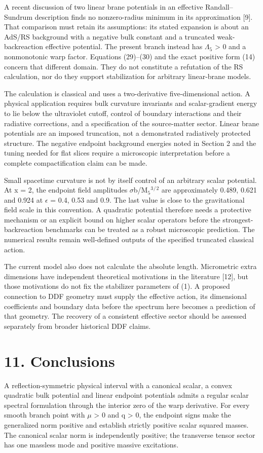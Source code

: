 \documentclass[11pt]{article}
\begin{document}
A recent discussion of two linear brane potentials in an effective Randall--Sundrum description finds no nonzero-radius minimum in its approximation [9]. That comparison must retain its assumptions: its stated expansion is about an AdS/RS background with a negative bulk constant and a truncated weak-backreaction effective potential. The present branch instead has \(\Lambda\)\({}_5\) > 0 and a nonmonotonic warp factor. Equations (29)--(30) and the exact positive form (14) concern that different domain. They do not constitute a refutation of the RS calculation, nor do they support stabilization for arbitrary linear-brane models.

The calculation is classical and uses a two-derivative five-dimensional action. A physical application requires bulk curvature invariants and scalar-gradient energy to lie below the ultraviolet cutoff, control of boundary interactions and their radiative corrections, and a specification of the source-matter sector. Linear brane potentials are an imposed truncation, not a demonstrated radiatively protected structure. The negative endpoint background energies noted in Section 2 and the tuning needed for flat slices require a microscopic interpretation before a complete compactification claim can be made.

Small spacetime curvature is not by itself control of an arbitrary scalar potential. At x = 2, the endpoint field amplitudes \(\sigma\)b/M\({}_5\)\({}^3\)\({}^{/}\)\({}^2\) are approximately 0.489, 0.621 and 0.924 at \(\epsilon\) = 0.4, 0.53 and 0.9. The last value is close to the gravitational field scale in this convention. A quadratic potential therefore needs a protective mechanism or an explicit bound on higher scalar operators before the strongest-backreaction benchmarks can be treated as a robust microscopic prediction. The numerical results remain well-defined outputs of the specified truncated classical action.

The current model also does not calculate the absolute length. Micrometric extra dimensions have independent theoretical motivations in the literature [12], but those motivations do not fix the stabilizer parameters of (1). A proposed connection to DDF geometry must supply the effective action, its dimensional coefficients and boundary data before the spectrum here becomes a prediction of that geometry. The recovery of a consistent effective sector should be assessed separately from broader historical DDF claims.

\section*{11. Conclusions}
A reflection-symmetric physical interval with a canonical scalar, a convex quadratic bulk potential and linear endpoint potentials admits a regular scalar spectral formulation through the interior zero of the warp derivative. For every smooth branch point with \(\mu\) > 0 and q > 0, the endpoint signs make the generalized norm positive and establish strictly positive scalar squared masses. The canonical scalar norm is independently positive; the transverse tensor sector has one massless mode and positive massive excitations.
\end{document}
